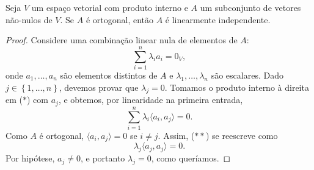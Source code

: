 \begin{theorem}
	Seja $V$ um espaço vetorial com produto interno e $A$ um subconjunto de vetores não-nulos de $V$. Se $A$ é ortogonal, então $A$ é linearmente independente.
\end{theorem}

\begin{proof}
	Considere uma combinação linear nula de elementos de $A$:
	\[\sum_{i=1}^n\lambda_i a_i=0_V,\tag{$*$}\]
	onde $a_1,\ldots,a_n$ são elementos distintos de $A$ e $\lambda_1,\ldots,\lambda_n$ são escalares. Dado $j\in\left\{1,\ldots,n\right\}$, devemos provar que $\lambda_j=0$. Tomamos o produto interno à direita em ($*$) com $a_j$, e obtemos, por linearidade na primeira entrada,
	\[\sum_{i=1}^n\lambda_i\langle a_i,a_j\rangle=0.\tag{$**$}\]
	Como $A$ é ortogonal, $\langle a_i,a_j\rangle=0$ se $i\neq j$. Assim, ($**$) se reescreve como
	\[\lambda_j\langle a_j,a_j\rangle=0.\]
	Por hipótese, $a_j\neq 0$, e portanto $\lambda_j=0$, como queríamos.
\end{proof}